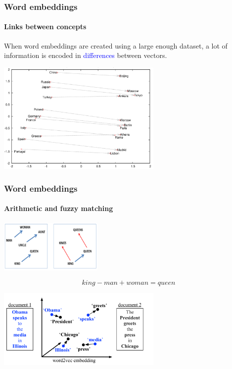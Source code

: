 \documentclass[9pt]{beamer}
\begin{document}
\begin{frame}
  \frametitle{Word embeddings}

  \framesubtitle{Links between concepts}

  When word embeddings are created using a large enough dataset, a lot
  of information is encoded in \textcolor{blue}{differences} between
  vectors.

  \begin{center}
    \includegraphics[width = 8cm]{images/word_embeddings_3.png}
  \end{center}
\end{frame}

\begin{frame}
  \frametitle{Word embeddings}

  \framesubtitle{Arithmetic and fuzzy matching}

  \begin{center}
    \includegraphics[width = 5cm]{images/word_embeddings_2.png}
  \end{center}
  \[
  king - man + woman = queen
  \]

  \begin{center}
    \includegraphics[width = 8cm]{images/word_embeddings_4.png}
  \end{center}

\end{frame}
\end{document}
